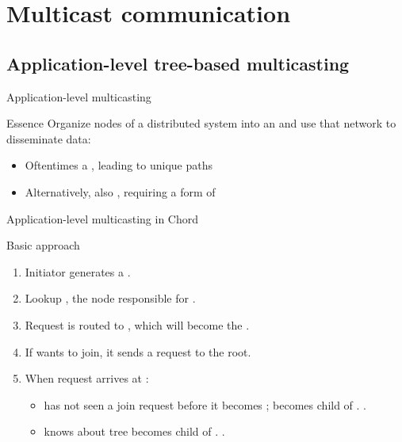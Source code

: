 \section{Multicast communication}
\subsection{Application-level tree-based multicasting}
\begin{slide}{Application-level multicasting}
  \begin{block}{Essence} 
    Organize nodes of a distributed system into an  and use that network to disseminate
    data:
    \begin{itemize}\tightlist
    \item Oftentimes a , leading to unique paths
    \item Alternatively, also , requiring a form of 
    \end{itemize}
  \end{block}
\end{slide}
  \begin{slide}{Application-level multicasting in Chord}
    \begin{block}{Basic approach}
      \begin{enumerate}\tightlist
      \item Initiator generates a  .
      \item Lookup , the node responsible for .
      \item Request is routed to , which will become the .
      \item If  wants to join, it sends a  request to the root.
      \item When request arrives at :
      
        \begin{itemize}\tightlist
	    \item {} has not seen a join request before \mathexpr{\Rightarrow} it becomes ;
           becomes child of . .
	    \item {} knows about tree \mathexpr{\Rightarrow}  becomes child of . .
        \end{itemize}
      \end{enumerate}
    \end{block}
  \end{slide}
